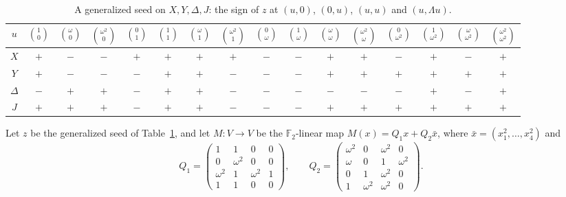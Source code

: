 \documentclass[11pt]{amsart}
\theoremstyle{definition}
\newcommand{\F}{\mathbb{F}}
\begin{document}
\begin{table}[ht]
\centering
\caption{A generalized seed on $X,Y,\Delta,J$: the sign of $z$ at $(u,0)$, $(0,u)$, $(u,u)$ and $(u,\Lambda u)$.}\label{tab:jordan}
\small
\setlength{\tabcolsep}{4pt}
\begin{tabular}{c*{15}{c}}
\toprule
$u$ & $\binom{1}{0}$ & $\binom{\omega}{0}$ & $\binom{\omega^2}{0}$ & $\binom{0}{1}$ & $\binom{1}{1}$ & $\binom{\omega}{1}$ & $\binom{\omega^2}{1}$ & $\binom{0}{\omega}$ & $\binom{1}{\omega}$ & $\binom{\omega}{\omega}$ & $\binom{\omega^2}{\omega}$ & $\binom{0}{\omega^2}$ & $\binom{1}{\omega^2}$ & $\binom{\omega}{\omega^2}$ & $\binom{\omega^2}{\omega^2}$\\
\midrule
$X$ & $+$&$-$&$-$&$+$&$+$&$+$&$+$&$-$&$-$&$+$&$+$&$-$&$+$&$-$&$+$\\
$Y$ & $+$&$-$&$-$&$-$&$+$&$+$&$-$&$-$&$-$&$+$&$+$&$+$&$+$&$+$&$+$\\
$\Delta$ & $-$&$+$&$+$&$-$&$+$&$+$&$-$&$-$&$-$&$-$&$-$&$-$&$+$&$-$&$+$\\
$J$ & $+$&$+$&$+$&$-$&$+$&$+$&$-$&$-$&$-$&$+$&$+$&$+$&$+$&$+$&$+$\\
\bottomrule
\end{tabular}
\end{table}

Let $z$ be the generalized seed of Table~\ref{tab:jordan}, and let $M\colon V\to V$ be the $\F_2$-linear map $M(x)=Q_1x+Q_2\bar x$, where $\bar x=(x_1^2,\dots,x_4^2)$ and
\[
Q_1=\begin{pmatrix}1&1&0&0\\0&\omega^2&0&0\\\omega^2&1&\omega^2&1\\1&1&0&0\end{pmatrix},\qquad
Q_2=\begin{pmatrix}\omega^2&0&\omega^2&0\\\omega&0&1&\omega^2\\0&1&\omega^2&0\\1&\omega^2&\omega^2&0\end{pmatrix}.
\]
\end{document}
